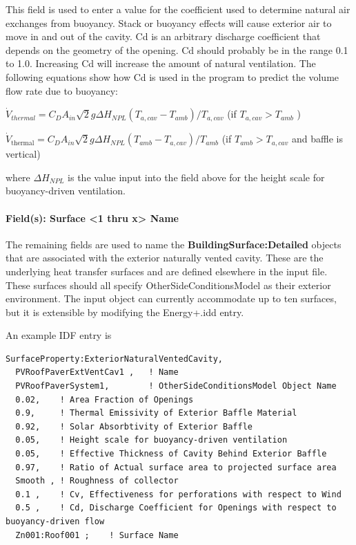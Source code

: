This field is used to enter a value for the coefficient used to determine natural air exchanges from buoyancy. Stack or buoyancy effects will cause exterior air to move in and out of the cavity. Cd is an arbitrary discharge coefficient that depends on the geometry of the opening. Cd should probably be in the range 0.1 to 1.0. Increasing Cd will increase the amount of natural ventilation. The following equations show how Cd is used in the program to predict the volume flow rate due to buoyancy:

\(\dot{V}_{thermal} = C_D A_{in} \sqrt 2 g \Delta H_{NPL} \left( T_{a,cav} - T_{amb} \right) / T_{a,cav}\) (if \(T_{a,cav} > T_{amb}\) )

\(\dot{V}_{\text{thermal}} = C_D A_{in} \sqrt 2 g \Delta H_{NPL} \left( T_{amb} - T_{a,cav} \right) / T_{amb}\) (if \(T_{amb} > T_{a,cav}\) and baffle is vertical)

where \(\Delta {H_{NPL}}\) is the value input into the field above for the height scale for buoyancy-driven ventilation.

\paragraph{Field(s): Surface \textless{}1 thru x\textgreater{} Name}\label{fields-surface-1-thru-x-name}

The remaining fields are used to name the \textbf{BuildingSurface:Detailed} objects that are associated with the exterior naturally vented cavity. These are the underlying heat transfer surfaces and are defined elsewhere in the input file. These surfaces should all specify OtherSideConditionsModel as their exterior environment. The input object can currently accommodate up to ten surfaces, but it is extensible by modifying the Energy+.idd entry.

An example IDF entry is

\begin{lstlisting}
SurfaceProperty:ExteriorNaturalVentedCavity,
  PVRoofPaverExtVentCav1 ,   ! Name
  PVRoofPaverSystem1,        ! OtherSideConditionsModel Object Name
  0.02,    ! Area Fraction of Openings
  0.9,     ! Thermal Emissivity of Exterior Baffle Material
  0.92,    ! Solar Absorbtivity of Exterior Baffle
  0.05,    ! Height scale for buoyancy-driven ventilation
  0.05,    ! Effective Thickness of Cavity Behind Exterior Baffle
  0.97,    ! Ratio of Actual surface area to projected surface area
  Smooth , ! Roughness of collector
  0.1 ,    ! Cv, Effectiveness for perforations with respect to Wind
  0.5 ,    ! Cd, Discharge Coefficient for Openings with respect to buoyancy-driven flow
  Zn001:Roof001 ;    ! Surface Name
\end{lstlisting}

